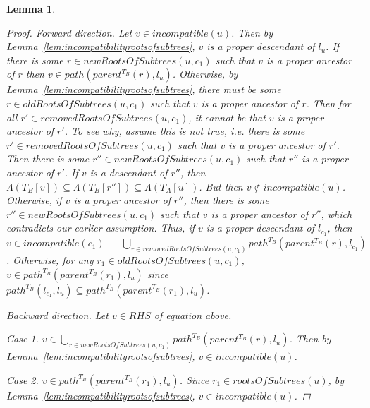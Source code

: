 \documentclass{article}
\newcommand{\leafset}{\Lambda}
\newtheorem{incompatibilityrecursive}[incompatibility]{Lemma}
\begin{document}
\begin{incompatibilityrecursive}
\begin{proof}
            \textit{Forward direction.} Let $v \in incompatible(u)$. Then by Lemma~\ref{lem:incompatibilityrootsofsubtrees}, $v$ is a proper descendant of $l_u$. If there is some $r \in newRootsOfSubtrees(u, c_1)$ such that $v$ is a proper ancestor of $r$ then $v \in path(parent^{T_B}(r), l_u)$. Otherwise, by Lemma~\ref{lem:incompatibilityrootsofsubtrees}, there must be some $r \in oldRootsOfSubtrees(u, c_1)$ such that $v$ is a proper ancestor of $r$. Then for all $r' \in removedRootsOfSubtrees(u, c_1)$, it cannot be that $v$ is a proper ancestor of $r'$. To see why, assume this is not true, i.e. there is some $r' \in removedRootsOfSubtrees(u, c_1)$ such that $v$ is a proper ancestor of $r'$. Then there is some $r'' \in newRootsOfSubtrees(u, c_1)$ such that $r''$ is a proper ancestor of $r'$. If $v$ is a descendant of $r''$, then $\leafset(T_B[v]) \subseteq \leafset(T_B[r'']) \subseteq \leafset(T_A[u])$. But then $v \not\in incompatible(u)$. Otherwise, if $v$ is a proper ancestor of $r''$, then there is some $r'' \in newRootsOfSubtrees(u, c_1)$ such that $v$ is a proper ancestor of $r''$, which contradicts our earlier assumption. Thus, if $v$ is a proper descendant of $l_{c_1}$, then $v \in incompatible(c_1)\ -\ \bigcup_{r \in removedRootsOfSubtrees(u, c_1)} path^{T_B}(parent^{T_B}(r), l_{c_1})$. Otherwise, for any $r_1 \in oldRootsOfSubtrees(u, c_1)$, $v \in path^{T_B}(parent^{T_B}(r_1), l_u)$ since $path^{T_B}(l_{c_1}, l_u) \subseteq path^{T_B}(parent^{T_B}(r_1), l_u)$.

            \textit{Backward direction.} Let $v \in RHS$ of equation above.

            \textit{Case 1.} $v \in \bigcup_{r \in newRootsOfSubtrees(u, c_1)} path^{T_B}(parent^{T_B}(r), l_u)$. Then by Lemma~\ref{lem:incompatibilityrootsofsubtrees}, $v \in incompatible(u)$.

            \textit{Case 2.} $v \in path^{T_B}(parent^{T_B}(r_1), l_u)$. Since $r_1 \in rootsOfSubtrees(u)$, by Lemma~\ref{lem:incompatibilityrootsofsubtrees}, $v \in incompatible(u)$.


\end{proof}
\end{incompatibilityrecursive}
\end{document}
